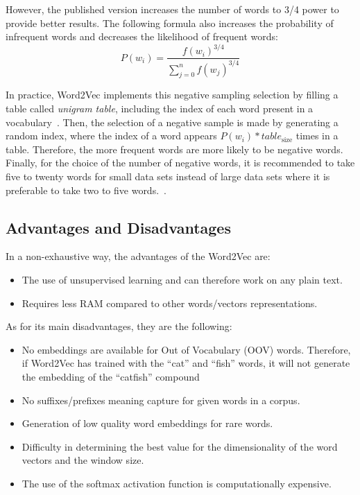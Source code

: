 However, the published version increases the number of words to 3/4 power to
provide better results. The following formula also increases the probability of
infrequent words and decreases the likelihood of frequent words:
\begin{equation} P(w_i) = \frac{f(w_i)^{3/4}}{\sum_{j=0}^nf(w_j)^{3/4}}
  \label{eq:w2v:ns:selection}
\end{equation}

In practice, Word2Vec implements this negative sampling selection by filling a
table called \emph{unigram table}, including the index of each word present in a
vocabulary~\citep{mccormick}. Then, the selection of a negative sample is made
by generating a random index, where the index of a word appears $P(w_i) *
{table}_{\text{size}}$ times in a table. Therefore, the more frequent words are
more likely to be negative words. Finally, for the choice of the number of
negative words, it is recommended to take five to twenty words for small data
sets instead of large data sets where it is preferable to take two to five
words.~\citep{inproceedings:mikolov}.

\subsection{Advantages and Disadvantages}
\label{subsec:w2v:pro:cons}

In a non-exhaustive way, the advantages of the Word2Vec are:
\begin{itemize}
\item The use of unsupervised learning and can therefore work on any plain text.
\item Requires less RAM compared to other words/vectors representations.
\end{itemize}

As for its main disadvantages, they are the following:
\begin{multicols}{2}
\begin{itemize}
\item No embeddings are available for Out of Vocabulary (OOV) words. Therefore,
if Word2Vec has trained with the ``cat'' and ``fish'' words, it will not generate
the embedding of the ``catfish'' compound
\item No suffixes/prefixes meaning capture for given words in a corpus.
\columnbreak
\item Generation of low quality word embeddings for rare words.
\item Difficulty in determining the best value for the dimensionality of the
  word vectors and the window size.
\item The use of the softmax activation function is computationally expensive.
\end{itemize}
\end{multicols}

